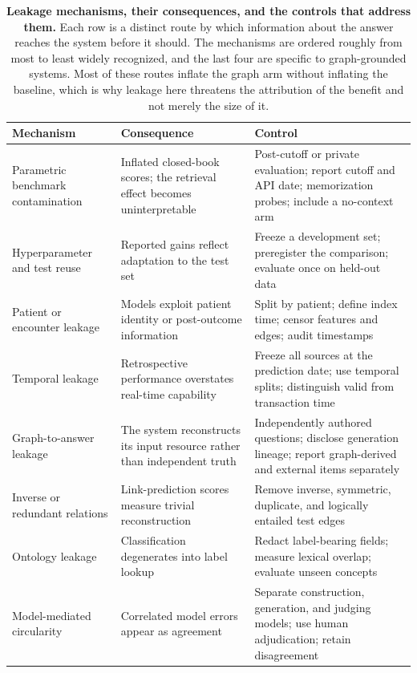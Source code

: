 \documentclass[10pt,a4paper]{article}
\begin{document}
\begin{table}[!ht]
\centering
\caption{\textbf{Leakage mechanisms, their consequences, and the controls that address them.} Each row
is a distinct route by which information about the answer reaches the system before it should. The
mechanisms are ordered roughly from most to least widely recognized, and the last four are specific to
graph-grounded systems. Most of these routes inflate the graph arm without inflating the baseline, which
is why leakage here threatens the attribution of the benefit and not merely the size of it.}
\label{tab:sleak}
\footnotesize
\begin{tabularx}{\textwidth}{@{}L{3.0cm} Y Y@{}}
\toprule
\textbf{Mechanism} & \textbf{Consequence} & \textbf{Control} \\
\midrule
Parametric benchmark contamination & Inflated closed-book scores; the retrieval effect becomes uninterpretable & Post-cutoff or private evaluation; report cutoff and API date; memorization probes; include a no-context arm \\
Hyperparameter and test reuse & Reported gains reflect adaptation to the test set & Freeze a development set; preregister the comparison; evaluate once on held-out data \\
Patient or encounter leakage & Models exploit patient identity or post-outcome information & Split by patient; define index time; censor features and edges; audit timestamps \\
Temporal leakage & Retrospective performance overstates real-time capability & Freeze all sources at the prediction date; use temporal splits; distinguish valid from transaction time \\
Graph-to-answer leakage & The system reconstructs its input resource rather than independent truth & Independently authored questions; disclose generation lineage; report graph-derived and external items separately \\
Inverse or redundant relations & Link-prediction scores measure trivial reconstruction & Remove inverse, symmetric, duplicate, and logically entailed test edges \\
Ontology leakage & Classification degenerates into label lookup & Redact label-bearing fields; measure lexical overlap; evaluate unseen concepts \\
Model-mediated circularity & Correlated model errors appear as agreement & Separate construction, generation, and judging models; use human adjudication; retain disagreement \\
\bottomrule
\end{tabularx}
\end{table}
\end{document}

